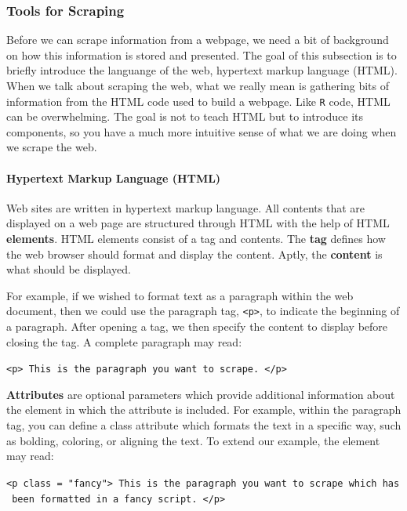 \documentclass[
]{article}
\begin{document}
\hypertarget{tools-for-scraping}{%
\subsubsection{Tools for Scraping}\label{tools-for-scraping}}

Before we can scrape information from a webpage, we need a bit of background on how this information is stored and presented. The goal of this subsection is to briefly introduce the languange of the web, hypertext markup language (HTML). When we talk about scraping the web, what we really mean is gathering bits of information from the HTML code used to build a webpage. Like \texttt{R} code, HTML can be overwhelming. The goal is not to teach HTML but to introduce its components, so you have a much more intuitive sense of what we are doing when we scrape the web.

\hypertarget{hypertext-markup-language-html}{%
\paragraph{Hypertext Markup Language (HTML)}\label{hypertext-markup-language-html}}

Web sites are written in hypertext markup language. All contents that are displayed on a web page are structured through HTML with the help of HTML \textbf{elements}. HTML elements consist of a tag and contents. The \textbf{tag} defines how the web browser should format and display the content. Aptly, the \textbf{content} is what should be displayed.

For example, if we wished to format text as a paragraph within the web document, then we could use the paragraph tag, \texttt{\textless{}p\textgreater{}}, to indicate the beginning of a paragraph. After opening a tag, we then specify the content to display before closing the tag. A complete paragraph may read:

\texttt{\textless{}p\textgreater{}\ This\ is\ the\ paragraph\ you\ want\ to\ scrape.\ \textless{}/p\textgreater{}}

\textbf{Attributes} are optional parameters which provide additional information about the element in which the attribute is included. For example, within the paragraph tag, you can define a class attribute which formats the text in a specific way, such as bolding, coloring, or aligning the text. To extend our example, the element may read:

\texttt{\textless{}p\ class\ =\ "fancy"\textgreater{}\ This\ is\ the\ paragraph\ you\ want\ to\ scrape\ which\ has\ been\ formatted\ in\ a\ fancy\ script.\ \textless{}/p\textgreater{}}
\end{document}
